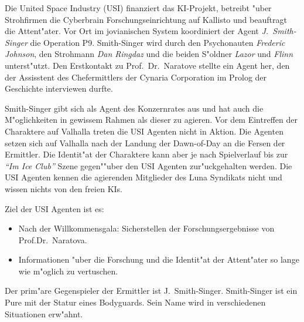 \newpage
{}

Die United Space Industry (USI) finanziert das KI-Projekt, betreibt "uber Strohfirmen die Cyberbrain Forschungseinrichtung auf Kallisto und beauftragt die Attent"ater. Vor Ort im jovianischen System koordiniert der Agent \emph{J.~Smith-Singer} die Operation P9. Smith-Singer wird durch den Psychonauten \emph{Frederic Johnson}, den Strohmann \emph{Dan Ringdaz} und die beiden S"oldner \emph{Lazor} und \emph{Flinn} unterst"utzt. Den Erstkontakt zu Prof.~Dr.~Naratove stellte ein Agent her, den der Assisstent des Chefermittlers der Cynaria Corporation  im Prolog der Geschichte interviewen durfte.

Smith-Singer gibt sich als Agent des Konzernrates aus und hat auch die M"oglichkeiten in gewissem Rahmen als dieser zu agieren. Vor dem Eintreffen der Charaktere auf Valhalla treten die USI Agenten nicht in Aktion. Die Agenten setzen sich auf Valhalla nach der Landung der Dawn-of-Day an die Fersen der Ermittler. Die Identit"at der Charaktere kann aber je nach Spielverlauf bis zur \emph{"`Im Ice Club"'} Szene gegen""uber den USI Agenten zur"uckgehalten werden. Die USI Agenten kennen die agierenden Mitglieder des Luna Syndikats nicht und wissen nichts von den freien KIs.

Ziel der USI Agenten ist es:

\begin{itemize}
    \item Nach der Willkommensgala: Sicherstellen der Forschungsergebnisse von Prof.Dr.~Naratova.
    \item Informationen "uber die Forschung und die Identit"at der Attent"ater so lange wie m"oglich zu vertuschen.    
\end{itemize}

Der prim"are Gegenspieler der Ermittler ist J.~Smith-Singer. Smith-Singer ist ein Pure mit der Statur eines Bodyguards. Sein Name wird in verschiedenen Situationen erw"ahnt.
\vfill
\pagebreak

